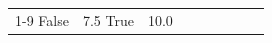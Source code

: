 \begin{table}[H]
\begin{tabular}{lllrlllll}
\cline{1-9}
False & 7.5%
\cline{1-9}
True & 10.0%

\end{tabular}
\end{table}
